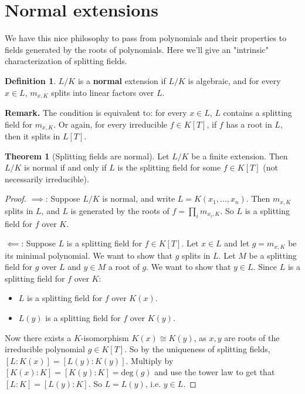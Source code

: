 \documentclass{article}
\theoremstyle{definition}
\newtheorem{theorem}{Theorem}[section]
\newtheorem{defn}{Definition}[section]
\begin{document}
\section{Normal extensions}
    We have this nice philosophy to pass from polynomials and their properties to fields generated by the roots of polynomials. Here we'll give an "intrinsic" characterization of splitting fields.
\begin{defn}
    $L/K$ is a \textbf{normal} extension if $L/K$ is algebraic, and for every $x \in L$, $m_{x,K}$ splits into linear factors over $L$.
\end{defn}
\textbf{Remark.} The condition is equivalent to: for every $x \in L$, $L$ contains a splitting field for $m_{x,K}$. Or again, for every irreducible $f \in K[T]$, if $f$ has a root in $L$, then it splits in $L[T]$.
\begin{theorem}[Splitting fields are normal]\label{7.1}
    Let $L/K$ be a finite extension. Then $L/K$ is normal if and only if $L$ is the splitting field for some $f \in K[T]$ (not necessarily irreducible).
\end{theorem}
\begin{proof}
    $\implies $: Suppose $L/K$ is normal, and write $L=K(x_1,\ldots,x_n)$. Then $m_{x,K}$ splits in $L$, and $L$ is generated by the roots of $f = \prod_{i}^{} m_{x_i,K}$. So $L$ is a splitting field for $f$ over $K$.
    \vspace{1mm}

    $\impliedby$: Suppose $L$ is a splitting field for $f \in K[T]$. Let $x \in L$ and let $g = m_{x,K}$ be its minimal polynomial. We want to show that $g$ splits in $L$. Let $M$ be a splitting field for $g$ over $L$ and $y \in M$ a root of $g$. We want to show that $y \in L$. Since $L$ is a splitting field for $f$ over $K$:
    \begin{itemize}
        \item $L$ is a splitting field for $f$ over $K(x)$.
        \item $L(y)$ is a splitting field for $f$ over $K(y)$.
    \end{itemize}
    Now there exists a $K$-isomorphism $K(x) \cong K(y)$, as $x,y$ are roots of the irreducible polynomial $g \in K[T]$. So by the uniqueness of splitting fields, $[L : K (x)] = [L(y) : K(y)]$. Multiply by $[K(x) : K] = [K(y) : K] = \text{deg}(g)$ and use the tower law to get that $[L:K] = [L(y) : K]$. So $L=L(y)$, i.e. $y \in L$.
\end{proof}

\end{document}
